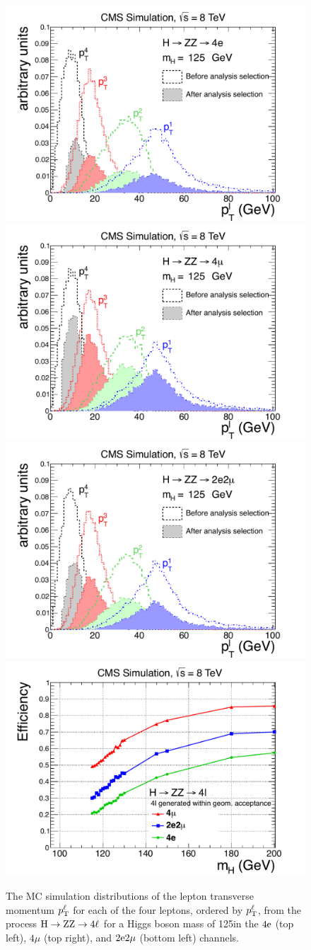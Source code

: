 \documentclass[12pt,twoside,a4paper,cmspaper,final,collab]{cms-tdr}
\begin{document}
\begin{figure}[htbp]
   \begin{center}
     \includegraphics[width=0.49\linewidth]{figures/HZZ_pteff_4e_MH125}
     \includegraphics[width=0.49\linewidth]{figures/HZZ_pteff_4mu_MH125}
     \includegraphics[width=0.49\linewidth]{figures/HZZ_pteff_2e2mu_MH125}
     \includegraphics[width=0.49\linewidth]{figures/HZZ_eff_2012_zoom}
     \caption{
The MC simulation distributions of the lepton transverse momentum $p_{\mathrm{T}}^{\ell}$ for each of
the four leptons, ordered by $p_{\mathrm{T}}^{\ell}$, from the process $\mathrm{H} \to  \mathrm{Z}\mathrm{Z} \to 4\ell$
for a Higgs boson mass of 125\GeV in the $4\mathrm{e}$ (top left), $4\mu$ (top
right), and $2\mathrm{e} 2\mu$ (bottom left) channels.
}
\end{center}
\end{figure}
\end{document}
